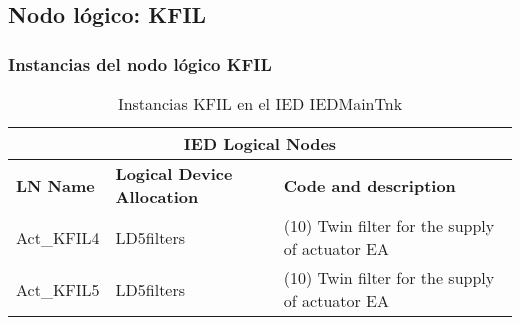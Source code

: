 
\subsection{Nodo l\'ogico: 			 KFIL}

    \subsubsection{Instancias del nodo l\'ogico KFIL}
    \begin{table}[H]
    \begin{center}
    \begin{tabular}{|l|l|p{6.8cm}|}
            \hline
            \multicolumn{3}{|c|}{\cellcolor[gray]{0.8} \textbf{IED Logical Nodes} } \\
            \hline
            \textbf{LN Name} & \textbf{Logical Device Allocation} & \textbf{Code and description} \\
            \hline
            Act\_KFIL4 & LD5filters & (10) Twin filter for the supply of actuator EA \\
            \hline
            Act\_KFIL5 & LD5filters & (10) Twin filter for the supply of actuator EA \\
            \hline
    \end{tabular}
    \caption{Instancias KFIL en el IED IEDMainTnk}
    \label{table:lnInstKFIL_actuator}
    \end{center}
    \end{table}
    
    
    
